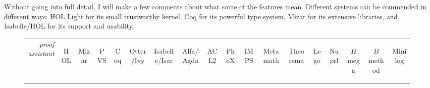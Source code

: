 \documentclass{llncs}
\begin{document}
Without going into full detail, I will make a few comments about what
some of the features mean.  Different systems can be commended in
different ways: HOL Light for its small trustworthy kernel, Coq for
its powerful type system, Mizar for its extensive libraries, and
Isabelle/HOL for its support and usability.

\bigskip
\noindent
\begin{figure}
\centering
\begin{tabular}{|r|ccccc|ccccc|ccccc|cc|}\hline
~{\it proof assistant}~
&\begin{sideways}HOL\end{sideways}
&\begin{sideways}Mizar\end{sideways}
&\begin{sideways}PVS\end{sideways}
&\begin{sideways}Coq\end{sideways}
&\begin{sideways}Otter/Ivy\end{sideways}
&\begin{sideways}Isabelle/Isar\end{sideways}
&\begin{sideways}Alfa/Agda\end{sideways}
&\begin{sideways}ACL2\end{sideways}
&\begin{sideways}PhoX\end{sideways}
&\begin{sideways}IMPS\end{sideways}
&\begin{sideways}Metamath\end{sideways}
&\begin{sideways}Theorema\end{sideways}
&\begin{sideways}Lego\end{sideways}
&\begin{sideways}Nuprl\end{sideways}
&\begin{sideways}$\Omega$mega\end{sideways}
&\begin{sideways}$B$ method\end{sideways}
&\begin{sideways}Minilog\end{sideways}\\

\end{tabular}
\end{figure}
\end{document}
